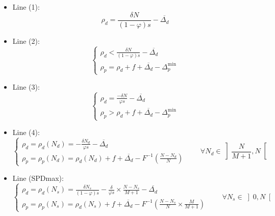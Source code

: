 \documentclass[english, a4paper]{article}
\theoremstyle{plain}
\theoremstyle{definition}
\theoremstyle{remark}
\begin{document}
\begin{itemize}
    \item Line (1):
    \begin{equation*}
        \rho_d = \frac{\delta N}{(1-\varphi)s} - \overline{\Delta_d}
    \end{equation*}

    \item Line (2):
    \begin{equation*}
        \left\{
        \begin{array}{l}
            \rho_d < \frac{\delta N}{(1 - \varphi)s} - \overline{\Delta _d}\\
            \rho_p = \rho_d + f + \overline{\Delta_d} - \Delta_p^{\text{min}}
        \end{array}
        \right.
    \end{equation*}

    \item Line (3):
    \begin{equation*}
        \left\{
        \begin{array}{l}
            \rho_d = \frac{-\delta N}{\varphi s} - \overline{\Delta_d}\\
            \rho_p > \rho_d + f + \overline{\Delta_d} - \Delta_p^{\text{min}}
        \end{array}
        \right.
    \end{equation*}

    \item Line (4):
    \begin{equation*}
        \left\{
        \begin{array}{l}
            \rho_d = \rho_d(N_d) = -\frac{\delta N_d}{\varphi s} - \overline{\Delta_d}\\
            \rho_p = \rho_p(N_d) = \rho_d(N_d) + f + \overline{\Delta_d} - F^{-1}\left( \frac{N - N_d}{N} \right)
        \end{array}
        \right. \qquad \forall N_d \in \left]\frac{N}{M+1}, N\right[
    \end{equation*}

    \item Line (SPDmax):
    \begin{equation*}
        \left\{
        \begin{array}{l}
            \rho_d = \rho_d (N_s) = \frac{\delta N_s}{(1-\varphi)s} - \frac{\delta}{\varphi s} \times \frac{N - N_s}{M+1} - \overline{\Delta_d}\\
            \rho_p = \rho_p(N_s) = \rho_d(N_s) + f + \overline{\Delta_d} - F^{-1} \left( \frac{N - N_s}{N} \times \frac{M}{M+1} \right)
        \end{array}
        \right.
        \qquad \forall N_s \in \left]0, N\right[
    \end{equation*}


\end{itemize}
\end{document}
